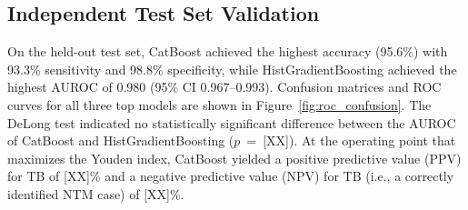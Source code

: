 \documentclass[journal=ancham, manuscript=article, layout=traditional]{achemso}
\begin{document}
\begin{table}
  \caption{Cross-validation performance (5-fold, training set)
    and independent test set performance for the three top-ranked models.
    Sens.~=~sensitivity (recall for TB); Spec.~=~specificity (recall for NTM).
    AUROC 95\% CI computed by the DeLong non-parametric method.}
  \label{tab:cv_results}
\end{table}

\subsection{Independent Test Set Validation}

On the held-out test set, CatBoost achieved the highest accuracy
(95.6\%) with 93.3\% sensitivity and 98.8\% specificity, while
HistGradientBoosting achieved the highest AUROC of 0.980 (95\% CI
0.967--0.993).
Confusion matrices and ROC curves for all three top models are shown
in Figure~\ref{fig:roc_confusion}.
The DeLong test indicated no statistically significant difference
between the AUROC of CatBoost and HistGradientBoosting
($p$~=~[XX]).
At the operating point that maximizes the Youden index,
CatBoost yielded a positive predictive value (PPV) for TB of
[XX]\% and a negative predictive value (NPV) for TB (i.e., a
correctly identified NTM case) of [XX]\%.
\end{document}
